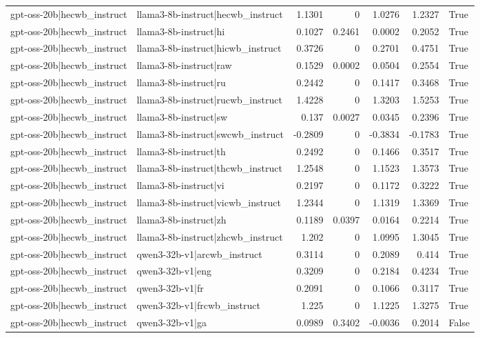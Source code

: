 \begin{table}
\begin{tabular}{l l r r r r l}
gpt-oss-20b|hecwb_instruct & llama3-8b-instruct|hecwb_instruct & 1.1301 & 0 & 1.0276 & 1.2327 & True \\
gpt-oss-20b|hecwb_instruct & llama3-8b-instruct|hi & 0.1027 & 0.2461 & 0.0002 & 0.2052 & True \\
gpt-oss-20b|hecwb_instruct & llama3-8b-instruct|hicwb_instruct & 0.3726 & 0 & 0.2701 & 0.4751 & True \\
gpt-oss-20b|hecwb_instruct & llama3-8b-instruct|raw & 0.1529 & 0.0002 & 0.0504 & 0.2554 & True \\
gpt-oss-20b|hecwb_instruct & llama3-8b-instruct|ru & 0.2442 & 0 & 0.1417 & 0.3468 & True \\
gpt-oss-20b|hecwb_instruct & llama3-8b-instruct|rucwb_instruct & 1.4228 & 0 & 1.3203 & 1.5253 & True \\
gpt-oss-20b|hecwb_instruct & llama3-8b-instruct|sw & 0.137 & 0.0027 & 0.0345 & 0.2396 & True \\
gpt-oss-20b|hecwb_instruct & llama3-8b-instruct|swcwb_instruct & -0.2809 & 0 & -0.3834 & -0.1783 & True \\
gpt-oss-20b|hecwb_instruct & llama3-8b-instruct|th & 0.2492 & 0 & 0.1466 & 0.3517 & True \\
gpt-oss-20b|hecwb_instruct & llama3-8b-instruct|thcwb_instruct & 1.2548 & 0 & 1.1523 & 1.3573 & True \\
gpt-oss-20b|hecwb_instruct & llama3-8b-instruct|vi & 0.2197 & 0 & 0.1172 & 0.3222 & True \\
gpt-oss-20b|hecwb_instruct & llama3-8b-instruct|vicwb_instruct & 1.2344 & 0 & 1.1319 & 1.3369 & True \\
gpt-oss-20b|hecwb_instruct & llama3-8b-instruct|zh & 0.1189 & 0.0397 & 0.0164 & 0.2214 & True \\
gpt-oss-20b|hecwb_instruct & llama3-8b-instruct|zhcwb_instruct & 1.202 & 0 & 1.0995 & 1.3045 & True \\
gpt-oss-20b|hecwb_instruct & qwen3-32b-v1|arcwb_instruct & 0.3114 & 0 & 0.2089 & 0.414 & True \\
gpt-oss-20b|hecwb_instruct & qwen3-32b-v1|eng & 0.3209 & 0 & 0.2184 & 0.4234 & True \\
gpt-oss-20b|hecwb_instruct & qwen3-32b-v1|fr & 0.2091 & 0 & 0.1066 & 0.3117 & True \\
gpt-oss-20b|hecwb_instruct & qwen3-32b-v1|frcwb_instruct & 1.225 & 0 & 1.1225 & 1.3275 & True \\
gpt-oss-20b|hecwb_instruct & qwen3-32b-v1|ga & 0.0989 & 0.3402 & -0.0036 & 0.2014 & False \\

\end{tabular}
\end{table}
